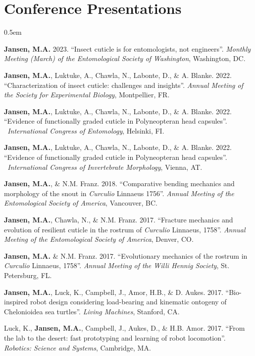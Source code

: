 \documentclass[12pt,a4paper]{article}
\begin{document}
\section*{Conference Presentations}
	\begin{description}
		\itemsep0.5em
		\item \textbf{Jansen, M.A.} 2023. ``Insect cuticle is for entomologists, not engineers''. \textit{Monthly Meeting (March) of the Entomological Society of Washington}, Washington, DC.
		\item \textbf{Jansen, M.A.}, Luktuke, A., Chawla, N., Labonte, D., \& A. Blanke. 2022. ``Characterization of insect cuticle: challenges and insights''. \textit{Annual Meeting of the Society for Experimental Biology}, Montpellier, FR.
		\item \textbf{Jansen, M.A.}, Luktuke, A., Chawla, N., Labonte, D., \& A. Blanke. 2022. ``Evidence of functionally graded cuticle
		in Polyneopteran head capsules''. \textit{~International Congress of Entomology}, Helsinki, FI.
		\item \textbf{Jansen, M.A.}, Luktuke, A., Chawla, N., Labonte, D., \& A. Blanke. 2022. ``Evidence of functionally graded cuticle
		in Polyneopteran head capsules''. \textit{~International Congress of Invertebrate Morphology}, Vienna, AT.
		\item \textbf{Jansen, M.A.}, \& N.M. Franz. 2018. ``Comparative bending mechanics and morphology of the snout in \textit{Curculio} Linnaeus 1756''. \textit{Annual Meeting of the Entomological Society of America}, Vancouver, BC.
		\item \textbf{Jansen, M.A.}, Chawla, N., \& N.M. Franz. 2017. ``Fracture mechanics and evolution of resilient cuticle in the rostrum of \textit{Curculio} Linnaeus, 1758''. \textit{Annual Meeting of the Entomological Society of America}, Denver, CO.
		\item \textbf{Jansen, M.A.} \& N.M. Franz. 2017. ``Evolutionary mechanics of the rostrum in \textit{Curculio} Linnaeus, 1758''. \textit{Annual Meeting of the Willi Hennig Society}, St. Petersburg, FL.
		\item \textbf{Jansen, M.A.}, Luck, K., Campbell, J., Amor, H.B., \& D. Aukes. 2017. ``Bio-inspired robot design considering load-bearing and kinematic ontogeny of Chelonioidea sea turtles''. \textit{Living Machines}, Stanford, CA.
		\item Luck, K., \textbf{Jansen, M.A.}, Campbell, J., Aukes, D., \& H.B. Amor. 2017. ``From the lab to the desert: fast prototyping and learning of robot locomotion''. \textit{Robotics: Science and Systems}, Cambridge, MA.

\end{description}
\end{document}
